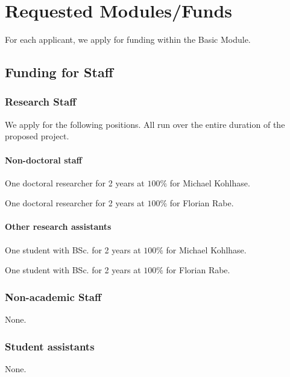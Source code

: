 \section{Requested Modules/Funds }

For each applicant, we apply for funding within the Basic Module.

\subsection{Funding for Staff }\label{sec:positions}
\subsubsection{Research Staff}

We apply for the following positions. All run over the entire duration of the proposed project.

\paragraph*{Non-doctoral staff}

One doctoral researcher for 2 years at $100 \%$ for Michael Kohlhase.

One doctoral researcher for 2 years at $100 \%$ for Florian Rabe.


\paragraph*{Other research assistants}

One student with BSc. for 2 years at $100 \%$ for Michael Kohlhase.

One student with BSc. for 2 years at $100 \%$ for Florian Rabe.

\subsubsection{Non-academic Staff} None.

\subsubsection{Student assistants} None.

